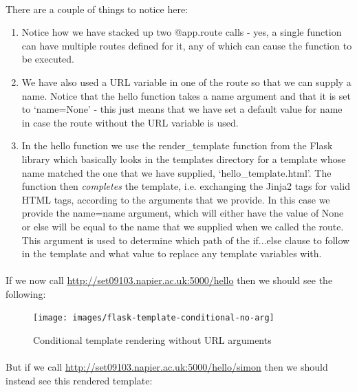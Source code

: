 \documentclass[12pt, a4paper, oneside]{book}
\begin{document}
\paragraph{} There are a couple of things to notice here:
\begin{enumerate}
\item Notice how we have stacked up two @app.route calls - yes, a single function can have multiple routes defined for it, any of which can cause the function to be executed.
\item We have also used a URL variable in one of the route so that we can supply a name. Notice that the hello function takes a name argument and that it is set to `name=None' - this just means that we have set a default value for name in case the route without the URL variable is used.
\item In the hello function we use the render\_template function from the Flask library which basically looks in the templates directory for a template whose name matched the one that we have supplied, `hello\_template.html'. The function then \emph{completes} the template, i.e. exchanging the Jinja2 tags for valid HTML tags, according to the arguments that we provide. In this case we provide the name=name argument, which will either have the value of None or else will be equal to the name that we supplied when we called the route. This argument is used to determine which path of the if...else clause to follow in the template and what value to replace any template variables with.
\end{enumerate}

\paragraph{} If we now call \url{http://set09103.napier.ac.uk:5000/hello} then we should see the following:

\begin{figure}[H]
\centering
\texttt{[image: images/flask-template-conditional-no-arg]}
\caption{Conditional template rendering without URL arguments}
\label{fig:flask-template-conditional-no-arg}
\end{figure}

\paragraph{} But if we call \url{http://set09103.napier.ac.uk:5000/hello/simon} then we should instead see this rendered template:
\end{document}
